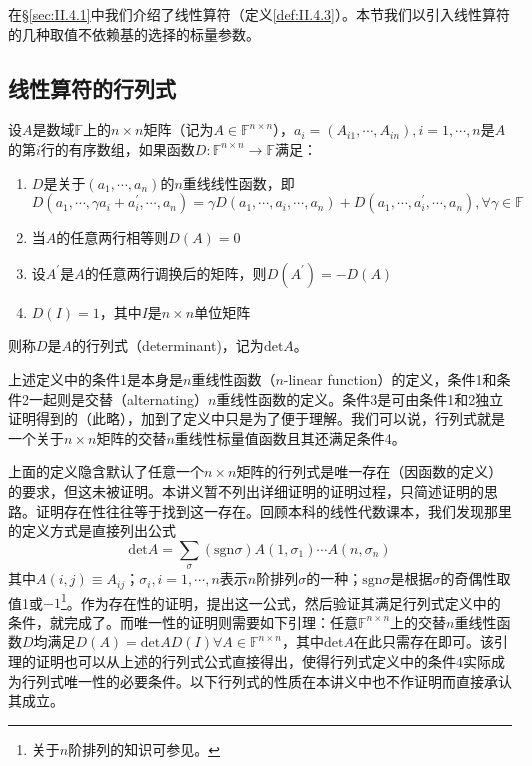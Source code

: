 \documentclass[main.tex]{subfiles}
\begin{document}
在\S\ref{sec:II.4.1}中我们介绍了线性算符（定义\ref{def:II.4.3}）。本节我们以引入线性算符的几种取值不依赖基的选择的标量参数。

\subsection{线性算符的行列式}
\begin{definition}
设$A$是数域$\mathbb{F}$上的$n\times n$矩阵（记为$A\in\mathbb{F}^{n\times n}$），$a_i=\left(A_{i1},\cdots,A_{in}\right),i=1,\cdots,n$是$A$的第$i$行的有序数组，如果函数$D:\mathbb{F}^{n\times n}\rightarrow\mathbb{F}$满足：
\begin{enumerate}
\item $D$是关于$\left(a_1,\cdots,a_n\right)$的$n$重线线性函数，即
\[
D\left(a_1,\cdots,\gamma a_i+a^\prime_i,\cdots,a_n\right)=\gamma D\left(a_1,\cdots,a_i,\cdots,a_n\right)+D\left(a_1,\cdots,a^\prime_i,\cdots,a_n\right),\forall\gamma\in\mathbb{F}
\]
\item 当$A$的任意两行相等则$D\left(A\right)=0$
\item 设$A^\prime$是$A$的任意两行调换后的矩阵，则$D\left(A^\prime\right)=-D\left(A\right)$
\item $D\left(I\right)=1$，其中$I$是$n\times n$单位矩阵
\end{enumerate}
则称$D$是$A$的行列式（determinant)，记为$\mathrm{det}A$。
\end{definition}
上述定义中的条件1是本身是$n$重线性函数（$n$-linear function）的定义，条件1和条件2一起则是交替（alternating）$n$重线性函数的定义。条件3是可由条件1和2独立证明得到的（此略\cite[\S 5.2,pp.~144\~146]{Hoffman1971}），加到了定义中只是为了便于理解。我们可以说，行列式就是一个关于$n\times n$矩阵的交替$n$重线性标量值函数且其还满足条件4。

上面的定义隐含默认了任意一个$n\times n$矩阵的行列式是唯一存在（因函数的定义）的要求，但这未被证明。本讲义暂不列出详细证明的证明过程，只简述证明的思路。证明存在性往往等于找到这一存在。回顾本科的线性代数课本，我们发现那里的定义方式\cite[\S 1.3“定义3.1”,p.~7]{周胜林2012线性代数}是直接列出公式
\[
\mathrm{det}A=\sum_{\sigma}\left(\mathrm{sgn}\sigma\right)A\left(1,\sigma_1\right)\cdots A\left(n,\sigma_n\right)
\]
其中$A\left(i,j\right)\equiv A_{ij}$；$\sigma_i,i=1,\cdots,n$表示$n$阶排列$\sigma$的一种；$\mathrm{sgn}\sigma$是根据$\sigma$的奇偶性取值1或$-1$\footnote{关于$n$阶排列的知识可参见\cite[\S1.2,p.~4]{周胜林2012线性代数}。}。作为存在性的证明，提出这一公式，然后验证其满足行列式定义中的条件，就完成了。而唯一性的证明则需要如下引理：任意$\mathbb{F}^{n\times n}$上的交替$n$重线性函数$D$均满足$D\left(A\right)=\mathrm{det}AD\left(I\right)\forall A\in\mathbb{F}^{n\times n}$，其中$\mathrm{det}A$在此只需存在即可。该引理的证明也可以从上述的行列式公式直接得出，使得行列式定义中的条件4实际成为行列式唯一性的必要条件。以下行列式的性质在本讲义中也不作证明而直接承认其成立。
\end{document}

